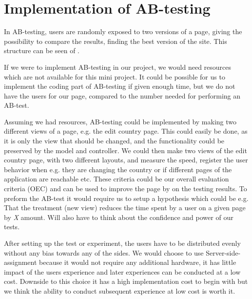 \section{Implementation of AB-testing}
In AB-testing, users are randomly exposed to two versions of a page, giving the possibility to compare the results, finding the best version of the site. This structure can be seen of .


If we were to implement AB-testing in our project, we would need resources which are not available for this mini project. It could be possible for us to implement the coding part of AB-testing if given enough time, but we do not have the users for our page, compared to the number needed for performing an AB-test. 

Assuming we had resources, AB-testing could be implemented by making two different views of a page, e.g. the edit country page. This could easily be done, as it is only the view that should be changed, and the functionality could be preserved by the model and controller. We could then make two views of the edit country page, with two different layouts, and measure the speed, register the user behavior when e.g. they are changing the country or if different pages of the application are reachable etc. These criteria could be our overall evaluation criteria (OEC) and can be used to improve the page by on the testing results. To preform the AB-test it would require us to setup a hypothesis which could be e.g. That the treatment (new view) reduces the time spent by a user on a given page by \textit{X} amount. Will also have to think about the confidence and power of our tests.

After setting up the test or experiment, the users have to be distributed evenly without any bias towards any of the sides. We would choose to use Server-side-assignment because it would not require any additional hardware, it has little impact of the users experience and later experiences can be conducted at a low cost. Downside to this choice it has a high implementation cost to begin with but we think the ability to conduct subsequent experience at low cost is worth it.